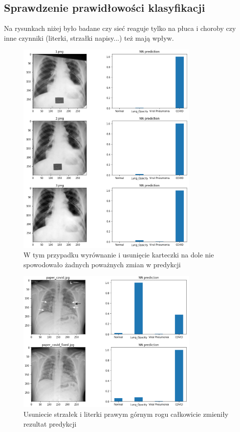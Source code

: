 \documentclass{article}
\begin{document}
\subsection{Sprawdzenie prawidłowości klasyfikacji}

Na rysunkach niżej było badane czy sieć reaguje tylko na płuca i choroby czy inne czynniki (literki, strzałki napisy...) też mają wpływ.


\begin{figure}[H]
	\centering
	\includegraphics[width=0.8\textwidth,keepaspectratio=true]{fixing_image_exp}
	\caption{W tym przypadku wyrównanie i usunięcie karteczki na dole nie spowodowało żadnych poważnych zmian w predykcji }
	\label{}
\end{figure}

\begin{figure}[H]
	\centering
	\includegraphics[width=0.8\textwidth,keepaspectratio=true]{paper_covid_exp}
	\caption{Usuniecie strzałek i literki prawym górnym rogu całkowicie zmieniły rezultat predykcji}
	\label{}
\end{figure}
\end{document}
